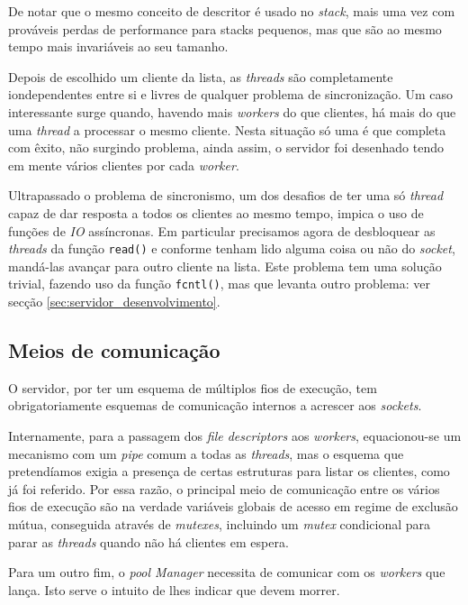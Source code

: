 	De notar que o mesmo conceito de descritor é usado no \emph{stack}, mais uma vez com prováveis perdas de performance para stacks pequenos, mas que são ao mesmo tempo mais invariáveis ao seu tamanho.

	Depois de escolhido um cliente da lista, as \emph{threads} são completamente iondependentes entre si e livres de qualquer problema de sincronização.
	Um caso interessante surge quando, havendo mais \emph{workers} do que clientes, há mais do que uma \emph{thread} a processar o mesmo cliente.
	Nesta situação só uma é que completa com êxito, não surgindo problema, ainda assim, o servidor foi desenhado tendo em mente vários clientes por cada \emph{worker}.
	
	Ultrapassado o problema de sincronismo, um dos desafios de ter uma só \emph{thread} capaz de dar resposta a todos os clientes ao mesmo tempo, impica o uso de funções de \emph{IO} assíncronas.
	Em particular precisamos agora de desbloquear as \emph{threads} da função \verb|read()| e conforme tenham lido alguma coisa ou não do \emph{\emph{socket}}, mandá-las avançar para outro cliente na lista.
	Este problema tem uma solução trivial, fazendo uso da função \verb|fcntl()|, mas que levanta outro problema: ver secção \ref{sec:servidor_desenvolvimento}.
	


\clearpage
\subsection{Meios de comunicação\label{sec:servidor_comunicacao}}

	\indent\indent O servidor, por ter um esquema de múltiplos fios de execução, tem obrigatoriamente esquemas de comunicação internos a acrescer aos \emph{sockets}.
	
	Internamente, para a passagem dos \emph{file descriptors} aos \emph{workers}, equacionou-se um mecanismo com um \emph{pipe} comum a todas as \emph{threads}, mas o esquema que pretendíamos exigia a presença de certas estruturas para listar os clientes, como já foi referido.
	Por essa razão, o principal meio de comunicação entre os vários fios de execução são na verdade variáveis globais de acesso em regime de exclusão mútua, conseguida através de \emph{mutexes}, incluindo um \emph{mutex} condicional para parar as \emph{threads} quando não há clientes em espera.
	
	Para um outro fim, o \emph{pool Manager} necessita de comunicar com os \emph{workers} que lança.
	Isto serve o intuito de lhes indicar que devem morrer.
	
